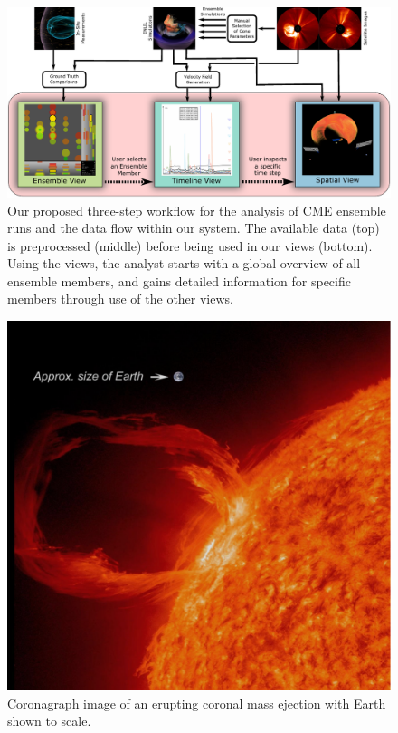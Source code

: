 \documentclass[journal]{vgtc}                %
\begin{document}
\begin{figure}
\centering
\includegraphics[width=\linewidth]{figures/workflow.pdf}
\caption{Our proposed three-step workflow for the analysis of CME ensemble runs and the data flow within our system. The available data (top) is preprocessed (middle) before being used in our views (bottom). Using the views, the analyst starts with a global overview of all ensemble members, and gains detailed information for specific members through use of the other views.}
\label{fig:workflow}
\end{figure}

\begin{figure}[!b]
\centering
\includegraphics[width=0.5\columnwidth]{figures/CME.png}
\caption{Coronagraph image of an erupting coronal mass ejection with Earth shown to scale.}
\label{fig:cme}
\end{figure}
\end{document}
